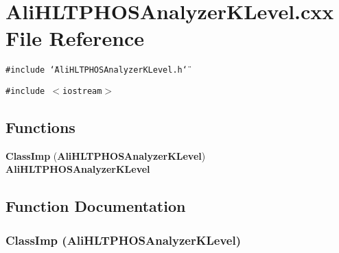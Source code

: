 \section{Ali\-HLTPHOSAnalyzer\-KLevel.cxx File Reference}
\label{AliHLTPHOSAnalyzerKLevel_8cxx}
{\tt \#include \char`\"{}Ali\-HLTPHOSAnalyzer\-KLevel.h\char`\"{}}\par
{\tt \#include $<$iostream$>$}\par
\subsection*{Functions}
\begin{CompactItemize}
\item 
{\bf Class\-Imp} ({\bf Ali\-HLTPHOSAnalyzer\-KLevel}) {\bf Ali\-HLTPHOSAnalyzer\-KLevel}
\end{CompactItemize}


\subsection{Function Documentation}
\subsubsection{\setlength{\rightskip}{0pt plus 5cm}Class\-Imp ({\bf Ali\-HLTPHOSAnalyzer\-KLevel})}\label{AliHLTPHOSAnalyzerKLevel_8cxx_a0}


